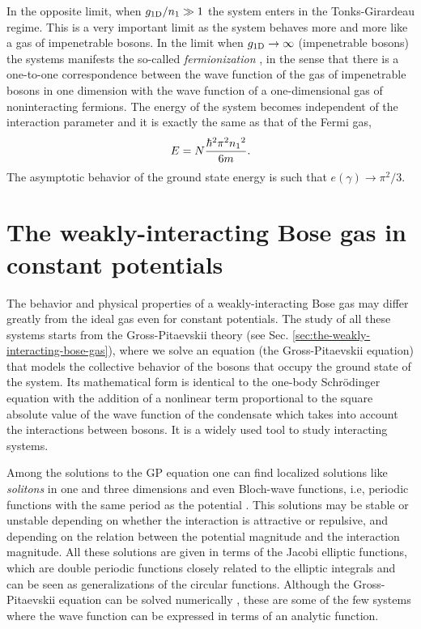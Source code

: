In the opposite limit, when $g_{ \mathrm{1D} } / {{n}_1} \gg 1$ the system enters in
the Tonks-Girardeau regime. This is a very important limit as the system behaves
more and more like a gas of impenetrable bosons. In the limit when $g_{ \mathrm{1D} } \to
  \infty$ (impenetrable bosons) the systems manifests the so-called
\textit{fermionization} \cite{bib:girardeau-j-math-phys.1960}, in the sense that
there is a one-to-one correspondence between the wave function of the gas of
impenetrable bosons in one dimension with the wave function of a one-dimensional
gas of noninteracting fermions. The energy of the system becomes independent of
the interaction parameter and it is exactly the same as that of the Fermi gas,
%
\begin{equation}
  \label{eq:tonks-girardeau-energy}
  E = N \frac{\hbar^2 \pi^2 {{n}_1}^2 }{6m}.
\end{equation}
%
The asymptotic behavior of the ground state energy is such that $e(\gamma)
  \rightarrow \pi^2 / 3$.


\section{The weakly-interacting Bose gas in constant potentials}

The behavior and physical properties of a weakly-interacting Bose gas may differ
greatly from the ideal gas even for constant potentials. The study of all these
systems starts from the Gross-Pitaevskii theory (see Sec.
\ref{sec:the-weakly-interacting-bose-gas}), where we solve an equation (the
Gross-Pitaevskii equation) that models the collective behavior of the bosons
that occupy the ground state of the system. Its mathematical form is identical
to the one-body Schrödinger equation with the addition of a nonlinear term
proportional to the square absolute value of the wave function of the condensate
which takes into account the interactions between bosons. It is a widely used
tool to study interacting systems.

Among the solutions to the GP equation one can find localized solutions like
\textit{solitons} in one and three dimensions
\cite{bib:seaman-phys-rev-A.71.033609.2005,
  bib:wang-ying-ying-mod-phys-lett-B.27.12.2013} and even Bloch-wave functions,
i.e, periodic functions with the same period as the potential
\cite{bib:smerzi-phys-rev-E.70.016605.2004}. This solutions may be stable or
unstable depending on whether the interaction is attractive or repulsive, and
depending on the relation between the potential magnitude and the interaction
magnitude. All these solutions are given in terms of the Jacobi elliptic
functions\nocite{bib:abramowitz-stegun-1965}, which are double periodic
functions closely related to the elliptic integrals and can be seen as
generalizations of the circular functions. Although the Gross-Pitaevskii
equation can be solved numerically
\cite{bib:berg-molmer-phys-rev-A.58.1480.1998,
  bib:adhikari-j-of-phys-B.36.12.2003}, these are some of the few systems where
the wave function can be expressed in terms of an analytic function.

